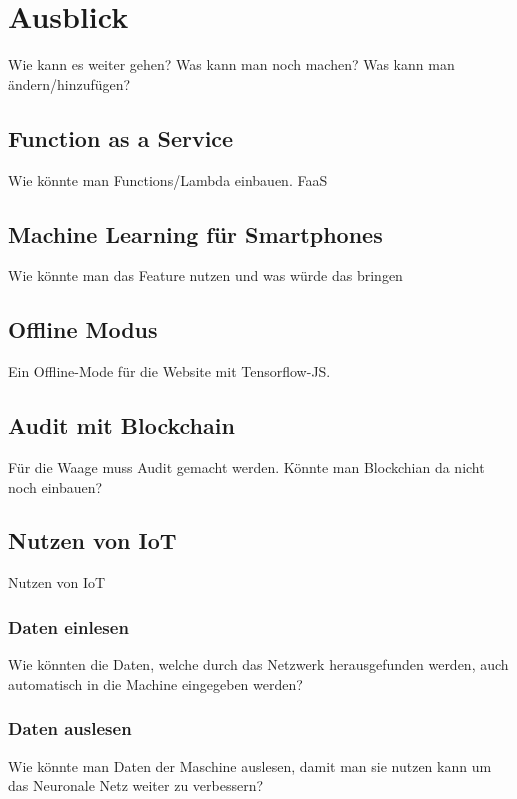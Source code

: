 \chapter{Ausblick}
\label{ch:ausblick}
Wie kann es weiter gehen? Was kann man noch machen? Was kann man ändern/hinzufügen?

\section{Function as a Service}
Wie könnte man Functions/Lambda einbauen. FaaS

\section{Machine Learning für Smartphones}
Wie könnte man das Feature nutzen und was würde das bringen

\section{Offline Modus}
Ein Offline-Mode für die Website mit Tensorflow-JS.

\section{Audit mit Blockchain}
Für die Waage muss Audit gemacht werden. Könnte man Blockchian da nicht noch einbauen?

\section{Nutzen von IoT}
Nutzen von IoT

\subsection{Daten einlesen}
Wie könnten die Daten, welche durch das Netzwerk herausgefunden werden, auch automatisch in die Machine eingegeben werden?

\subsection{Daten auslesen}
Wie könnte man Daten der Maschine auslesen, damit man sie nutzen kann um das Neuronale Netz weiter zu verbessern?